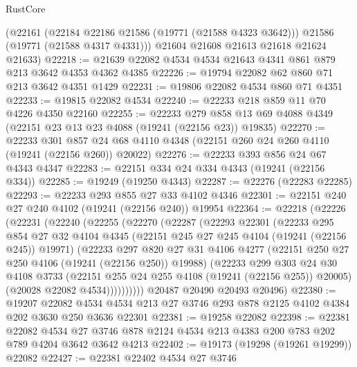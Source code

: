 \begin{lexlean}{RustCore}
\begin{coremodule}
      (@22161
        (@22184 @22186 @21586 (@19771 (@21588 @4323 @3642)))
        @21586
        (@19771 (@21588 @4317 @4331)))
      @21604
      @21608
      @21613
      @21618
      @21624
      @21633)
@22218 := @21639 @22082 @4534 @4534 @21643 @4341 @861 @879 @213 @3642 @4353 @4362 @4385
@22226 := @19794 @22082 @62 @860 @71 @213 @3642 @4351 @1429
@22231 := @19806 @22082 @4534 @860 @71 @4351
@22233 := @19815 @22082 @4534
@22240 := @22233 @218 @859 @11 @70 @4226 @4350 @22160
@22255 := @22233
    @279
    @858
    @13
    @69
    @4088
    @4349
    (@22151 @23 @13 @23 @4088 (@19241 (@22156 @23)) @19835)
@22270 := @22233
    @301
    @857
    @24
    @68
    @4110
    @4348
    (@22151 @260 @24 @260 @4110 (@19241 (@22156 @260)) @20022)
@22276 := @22233 @393 @856 @24 @67 @4343 @4347
@22283 := @22151 @334 @24 @334 @4343 (@19241 (@22156 @334))
@22285 := @19249 (@19250 @4343)
@22287 := @22276 (@22283 @22285)
@22293 := @22233 @293 @855 @27 @33 @4102 @4346
@22301 := @22151 @240 @27 @240 @4102 (@19241 (@22156 @240)) @19954
@22364 := @22218
    (@22226
      (@22231
        (@22240
          (@22255
            (@22270
              (@22287
                (@22293
                  @22301
                  (@22233
                    @295
                    @854
                    @27
                    @32
                    @4104
                    @4345
                    (@22151 @245 @27 @245 @4104 (@19241 (@22156 @245)) @19971)
                    (@22233
                      @297
                      @820
                      @27
                      @31
                      @4106
                      @4277
                      (@22151 @250 @27 @250 @4106 (@19241 (@22156 @250)) @19988)
                      (@22233
                        @299
                        @303
                        @24
                        @30
                        @4108
                        @3733
                        (@22151 @255 @24 @255 @4108 (@19241 (@22156 @255)) @20005)
                        (@20028 @22082 @4534))))))))))
      @20487
      @20490
      @20493
      @20496)
@22380 := @19207
    @22082
    @4534
    @4534
    @213
    @27
    @3746
    @293
    @878
    @2125
    @4102
    @4384
    @202
    @3630
    @250
    @3636
    @22301
@22381 := @19258 @22082
@22398 := @22381
    @22082
    @4534
    @27
    @3746
    @878
    @2124
    @4534
    @213
    @4383
    @200
    @783
    @202
    @789
    @4204
    @3642
    @3642
    @4213
@22402 := @19173 (@19298 (@19261 @19299)) @22082
@22427 := @22381
    @22402
    @4534
    @27
    @3746

\end{coremodule}
\end{lexlean}
